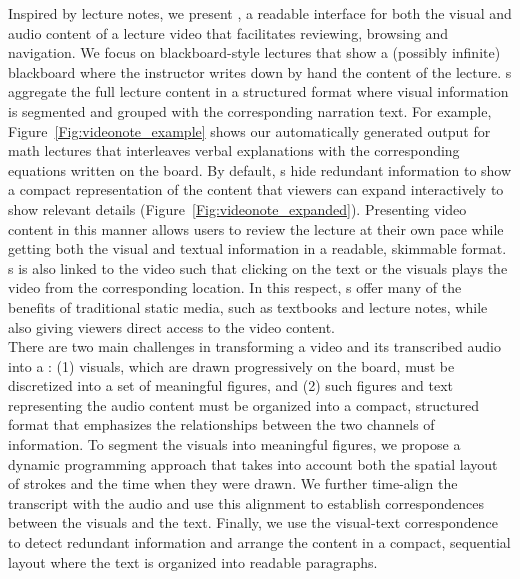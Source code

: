 Inspired by lecture notes, we present \systemname, a readable interface for both the visual and audio content of a lecture video that facilitates reviewing, browsing and navigation. 
%
We focus on blackboard-style lectures that show a (possibly infinite) blackboard where the instructor writes down by hand the content of the lecture. \systemname s aggregate the full lecture content in a structured format where visual information is segmented and grouped with the corresponding narration text. For example, Figure~\ref{Fig:videonote_example} shows our automatically generated output for math lectures that interleaves verbal explanations with the corresponding equations written on the board. 
%
By default, \systemname s hide redundant information to show a compact representation of the content that viewers can expand interactively to show relevant details (Figure~\ref{Fig:videonote_expanded}). 
%
Presenting video content in this manner allows users to review the lecture at their own pace while getting both the visual and textual information in a readable, skimmable format.
%
\systemname s is also linked to the video such that clicking on the text or the visuals plays the video from the corresponding location.
%
In this respect, \systemname s offer many of the benefits of traditional static media, such as textbooks and lecture notes, while also giving viewers direct access to the video content.\\

There are two main challenges in transforming a video and its transcribed audio into a \systemname : (1) visuals, which are drawn progressively on the board, must be discretized into  a set of meaningful figures, and (2) such figures and text representing the audio content must be organized into a compact, structured format that emphasizes the relationships between the two channels of information.
%
To segment the visuals into meaningful figures, we propose a dynamic programming approach that takes into account both the spatial layout of strokes and the time when they were drawn. We further time-align the transcript with the audio and use this alignment to establish correspondences between the visuals and the text. Finally, we use the visual-text correspondence to detect redundant information and arrange the content in a compact, sequential layout where the text is organized into readable paragraphs.\\

